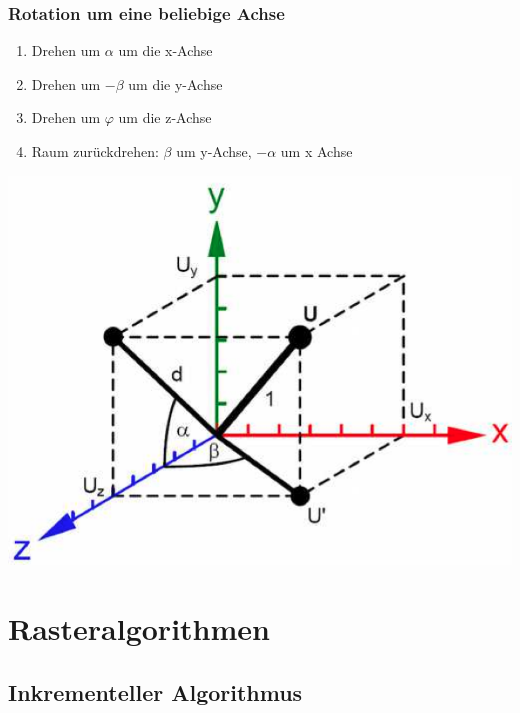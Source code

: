 \documentclass[10pt]{article}
\begin{document}
\subsubsection{Rotation um eine beliebige Achse}
\begin{enumerate}
	\item Drehen um $\alpha$ um die x-Achse
	\item Drehen um $-\beta$ um die y-Achse
	\item Drehen um $\varphi$ um die z-Achse
	\item Raum zurückdrehen: $\beta$ um y-Achse, $-\alpha$ um x Achse
\end{enumerate}
\begin{center}
	\includegraphics[scale=0.3]{rotation.png}
\end{center}

\newpage
\section{Rasteralgorithmen}
\subsection{Inkrementeller Algorithmus}

\end{document}
